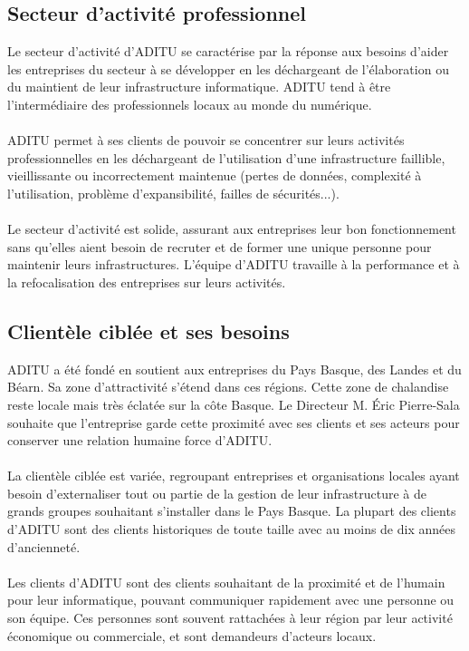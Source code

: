 \subsection{Secteur d'activité professionnel}

Le secteur d'activité d'ADITU se caractérise par la réponse aux besoins d'aider les entreprises du secteur à se développer en les déchargeant de l'élaboration ou du maintient de leur infrastructure informatique. ADITU tend à être l'intermédiaire des professionnels locaux au monde du numérique.
\\ \\
ADITU permet à ses clients de pouvoir se concentrer sur leurs activités professionnelles en les déchargeant de l'utilisation d'une infrastructure faillible, vieillissante ou incorrectement maintenue (pertes de données, complexité à l'utilisation, problème d'expansibilité, failles de sécurités...).  
\\ \\
Le secteur d'activité est solide, assurant aux entreprises leur bon fonctionnement sans qu'elles aient besoin de recruter et de former une unique personne pour maintenir leurs infrastructures. L'équipe d'ADITU travaille à la performance et à la refocalisation des entreprises sur leurs activités.

\subsection{Clientèle ciblée et ses besoins}

ADITU a été fondé en soutient aux entreprises du Pays Basque, des Landes et du Béarn. Sa zone d'attractivité s'étend dans ces régions. Cette zone de chalandise reste locale mais très éclatée sur la côte Basque. Le Directeur M. Éric Pierre-Sala souhaite que l'entreprise garde cette proximité avec ses clients et ses acteurs pour conserver une relation humaine force d'ADITU.
\\ \\
La clientèle ciblée est variée, regroupant entreprises et organisations locales ayant besoin d'externaliser tout ou partie de la gestion de leur infrastructure à de grands groupes souhaitant s'installer dans le Pays Basque. La plupart des clients d'ADITU sont des clients historiques de toute taille avec au moins de dix années d'ancienneté.
\\ \\
Les clients d'ADITU sont des clients souhaitant de la proximité et de l'humain pour leur informatique, pouvant communiquer rapidement avec une personne ou son équipe. Ces personnes sont souvent rattachées à leur région par leur activité économique ou commerciale, et sont demandeurs d'acteurs locaux.


